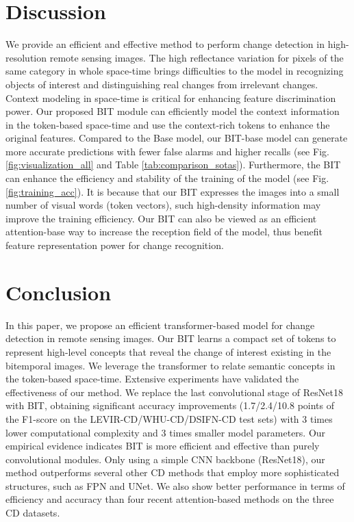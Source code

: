 \documentclass[journal]{IEEEtran}
\begin{document}
\section{Discussion}
\label{sec:discussion}
We provide an efficient and effective method to perform change detection in high-resolution remote sensing images. The high reflectance variation for pixels of the same category in whole space-time brings difficulties to the model in recognizing objects of interest and distinguishing real changes from irrelevant changes. Context modeling in space-time is critical for enhancing feature discrimination power. Our proposed BIT module can efficiently model the context information in the token-based space-time and use the context-rich tokens to enhance the original features. Compared to the Base model, our BIT-base model can generate more accurate predictions with fewer false alarms and higher recalls (see Fig. \ref{fig:visualization_all} and Table \ref{tab:comparison_sotas}). Furthermore, the BIT can enhance the efficiency and stability of the training of the model (see Fig. \ref{fig:training_acc}). It is because that our BIT expresses the images into a small number of visual words (token vectors), such high-density information may improve the training efficiency. Our BIT can also be viewed as an efficient attention-base way to increase the reception field of the model, thus benefit feature representation power for change recognition.




\section{Conclusion}
\label{sec:conclusion}
In this paper, we propose an efficient transformer-based model for change detection in remote sensing images. Our BIT learns a compact set of tokens to represent high-level concepts that reveal the change of interest existing in the bitemporal images. We leverage the transformer to relate semantic concepts in the token-based space-time. Extensive experiments have validated the effectiveness of our method. We replace the last convolutional stage of ResNet18 with BIT, obtaining significant accuracy improvements (1.7/2.4/10.8 points of the F1-score on the LEVIR-CD/WHU-CD/DSIFN-CD test sets) with 3 times lower computational complexity and 3 times smaller model parameters. Our empirical evidence indicates BIT is more efficient and effective than purely convolutional modules. Only using a simple CNN backbone (ResNet18), our method outperforms several other CD methods that employ more sophisticated structures, such as FPN and UNet. We also show better performance in terms of efficiency and accuracy than four recent attention-based methods on the three CD datasets.
\end{document}
